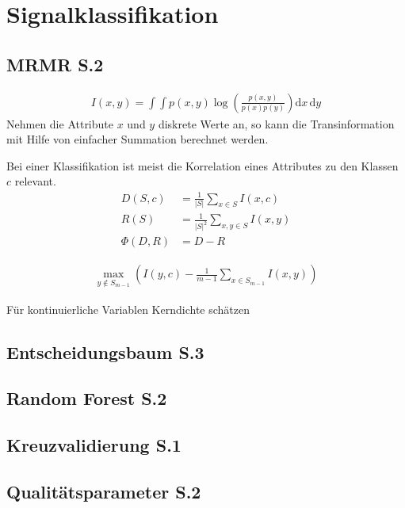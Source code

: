 \thispagestyle{plain}
\chapter{Signalklassifikation}
\section{MRMR S.2}
\begin{align}
I(x,y) = \int \int p(x,y) \log\left(\frac{p(x,y)}{p(x)p(y)}\right) \text{d}x\,\text{d}y
\end{align}
Nehmen die Attribute $x$ und $y$ diskrete Werte an, so kann die Transinformation mit Hilfe von einfacher Summation berechnet werden.

Bei einer Klassifikation ist meist die Korrelation eines Attributes zu den Klassen $c$ relevant.
\begin{align}
D(S,c) &= \frac{1}{|S|} \sum_{x \in S} I(x,c) \\
R(S) &= \frac{1}{|S|^2} \sum_{x,y \in S} I(x,y) \\
\Phi(D,R)&= D-R
\end{align}

\begin{align}
\max_{y \notin S_{m-1}} \left( I(y,c) - \frac{1}{m-1} \sum_{x \in S_{m-1}} I(x,y) \right)
\end{align}

Für kontinuierliche Variablen Kerndichte schätzen 
\section{Entscheidungsbaum S.3}

\section{Random Forest S.2}
\section{Kreuzvalidierung S.1}
\section{Qualitätsparameter S.2}